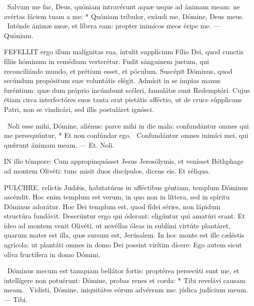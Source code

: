 \R\ Salvum me fac, Deus, quóniam intravérunt aquæ usque ad ánimam meam: ne avértas fáciem tuam a me: * Quóniam tríbulor, exáudi me, Dómine, Deus meus. \V\ Inténde ánimæ meæ, et líbera eam: propter inimícos meos éripe me. --- Quóniam.


\lettrine[lines=2]{F}{EFELLIT} ergo illum malígnitas sua, íntulit supplícium Fílio Dei, quod cunctis fíliis hóminum in remédium verterétur. Fudit sánguinem justum, qui reconciliándo mundo, et prétium esset, et póculum. Suscépit Dóminus, quod secúndum propósitum suæ voluntátis elégit. Admísit in se ímpias manus furéntium: quæ dum próprio incúmbunt scéleri, famulátæ sunt Redemptóri. Cujus étiam circa interfectóres suos tanta erat pietátis afféctio, ut de cruce súpplicans Patri, non se vindicári, sed illis postuláret ignósci.

\R\ Noli esse mihi, Dómine, aliénus: parce mihi in die mala: confundántur omnes qui me persequúntur, * Et non confúndar ego. \V\ Confundántur omnes inimíci mei, qui quǽrunt ánimam meam. --- Et. Noli.




\lettrine[lines=2]{I}{N} illo témpore: Cum appropinquásset Jesus Jerosólymis, et venísset Béthphage ad montem Olivéti: tunc misit duos discípulos, dicens eis. Et réliqua.



\lettrine[lines=2]{P}{ULCHRE}, relíctis Judǽis, habitatúrus in afféctibus géntium, templum Dóminus ascéndit. Hoc enim templum est verum, in quo non in líttera, sed in spíritu Dóminus adorátur. Hoc Dei templum est, quod fídei séries, non lápidum structúra fundávit. Deserúntur ergo qui óderant: eligúntur qui amatúri erant. Et ídeo ad montem venit Olivéti, ut novéllas óleas in sublími virtúte plantáret, quarum mater est illa, quæ sursum est, Jerúsalem. In hoc monte est ille cæléstis agrícola: ut plantáti omnes in domo Dei possint virítim dícere: Ego autem sicut olíva fructífera in domo Dómini.

\R\ Dóminus mecum est tamquam bellátor fortis: proptérea persecúti sunt me, et intellígere non potuérunt: Dómine, probas renes et corda: * Tibi revelávi causam meam. \V\ Vidísti, Dómine, iniquitátes eórum advérsum me: júdica judícium meum. --- Tibi.

